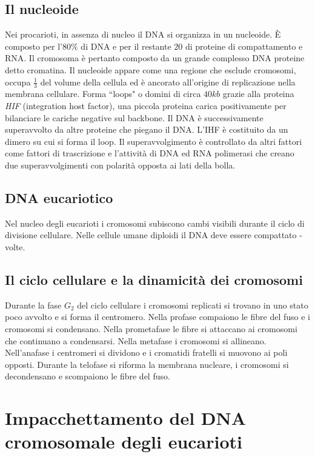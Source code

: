 \subsection{Il nucleoide}
Nei procarioti, in assenza di nucleo il DNA si organizza in un nucleoide. \`E composto per l'$80\%$ di DNA e per il restante $20$ di proteine di compattamento e RNA. Il cromosoma 
\`e pertanto composto da un grande complesso DNA proteine detto cromatina. Il nucleoide appare come una regione che esclude cromosomi, occupa $\frac{1}{3}$ del volume della cellula ed
\`e ancorato all'origine di replicazione nella membrana cellulare. Forma ``loops" o domini di circa $40kb$ grazie alla proteina \emph{HIF} (integration host factor), una piccola
proteina carica positivamente per bilanciare le cariche negative sul backbone. Il DNA \`e successivamente superavvolto da altre proteine che piegano il DNA. L'IHF \`e costituito da
un dimero su cui si forma il loop. Il superavvolgimento \`e controllato da altri fattori come fattori di trascrizione e l'attivit\`a di DNA ed RNA polimerasi che creano due
superavvolgimenti con polarit\`a opposta ai lati della bolla.
\subsection{DNA eucariotico}
Nel nucleo degli eucarioti i cromosomi subiscono cambi visibili durante il ciclo di divisione cellulare. Nelle cellule umane diploidi il DNA deve essere compattato 
- volte. 
\subsection{Il ciclo cellulare e la dinamicit\`a dei cromosomi}
Durante la fase $G_2$ del ciclo cellulare i cromosomi replicati si trovano in uno stato poco avvolto e si forma il centromero. Nella profase compaiono le fibre del fuso e i cromosomi
si condensano. Nella prometafase le fibre si attaccano ai cromosomi che continuano a condensarsi. Nella metafase i cromosomi si allineano. Nell'anafase i centromeri si dividono e
i cromatidi fratelli si muovono ai poli opposti. Durante la telofase si riforma la membrana nucleare, i cromosomi si decondensano e scompaiono le fibre del fuso. 
\section{Impacchettamento del DNA cromosomale degli eucarioti}
